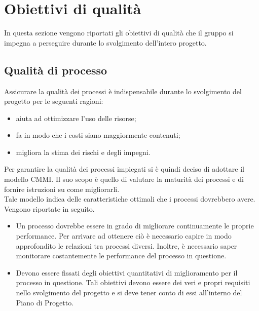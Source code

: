 
\section{Obiettivi di qualità}
	In questa sezione vengono riportati gli obiettivi di qualità che il gruppo \groupname{} si impegna a perseguire durante lo svolgimento dell'intero 
	progetto.
	\subsection{Qualità di processo}
		Assicurare la qualità dei processi è indispensabile durante lo svolgimento del progetto per le seguenti ragioni:
		\begin{itemize}
			\item aiuta ad ottimizzare l'uso delle risorse;
			\item fa in modo che i costi siano maggiormente contenuti;
			\item migliora la stima dei rischi e degli impegni.
		\end{itemize}
		Per garantire la qualità dei processi impiegati si è quindi deciso di adottare il modello CMMI. Il suo scopo è quello di valutare la maturità dei 
		processi e di fornire istruzioni su come migliorarli.\\
		Tale modello indica delle caratteristiche ottimali che i processi dovrebbero avere. Vengono riportate in seguito.
		\begin{itemize}
			\item Un processo dovrebbe essere in grado di migliorare continuamente le proprie performance. Per arrivare ad ottenere ciò è necessario 
			capire in modo approfondito le relazioni tra processi diversi. Inoltre, è necessario saper monitorare costantemente le performance del 
			processo in questione.
			\item Devono essere fissati degli obiettivi quantitativi di miglioramento per il processo in questione. Tali obiettivi devono essere dei veri 
			e propri requisiti nello svolgimento del progetto e si deve tener conto di essi all'interno del Piano di Progetto.
		\end{itemize}
